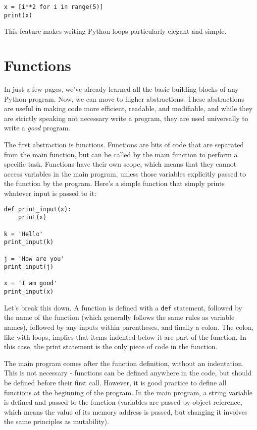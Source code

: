 \documentclass[12pt]{article}
\newcommand{\code}{\texttt}
\begin{document}
\begin{lstlisting}[frame=single] 
x = [i**2 for i in range(5)]
print(x)
\end{lstlisting}

This feature makes writing Python loops particularly elegant and simple.

\newpage
\section{Functions}
In just a few pages, we've already learned all the basic building blocks of any Python program. Now, we can move to higher abstractions. These abstractions are useful in making code more efficient, readable, and modifiable, and while they are strictly speaking not necessary write a program, they are used universally to write a \textit{good} program.

The first abstraction is functions. Functions are bits of code that are separated from the main function, but can be called by the main function to perform a specific task. Functions have their own scope, which means that they cannot access variables in the main program, unless those variables explicitly passed to the function by the program. Here's a simple function that simply prints whatever input is passed to it:

\begin{lstlisting}[frame=single] 
def print_input(x):
    print(x)

k = 'Hello'
print_input(k)

j = 'How are you'
print_input(j)

x = 'I am good'
print_input(x)
\end{lstlisting}

Let's break this down. A function is defined with a \code{def} statement, followed by the name of the function (which generally follows the same rules as variable names), followed by any inputs within parentheses, and finally a colon. The colon, like with loops, implies that items indented below it are part of the function. In this case, the print statement is the only piece of code in the function. 

The main program comes after the function definition, without an indentation. This is not necessary - functions can be defined anywhere in the code, but should be defined before their first call. However, it is good practice to define all functions at the beginning of the program. In the main program, a string variable is defined and passed to the function (variables are passed by object reference, which means the value of its memory address is passed, but changing it involves the same principles as mutability).
\end{document}
